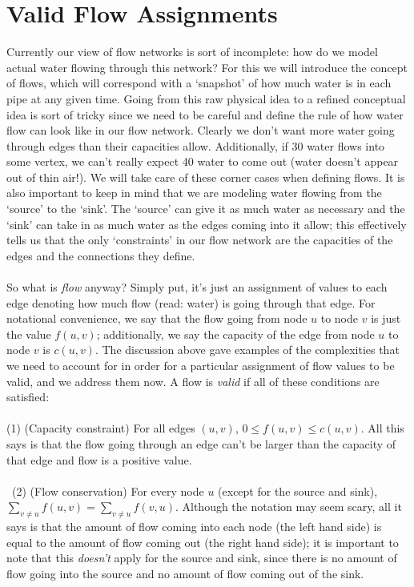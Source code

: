 \documentclass[11pt]{article}
\theoremstyle{plain}
\theoremstyle{definition}
\begin{document}
\section{Valid Flow Assignments}
Currently our view of flow networks is sort of incomplete: how do we model actual water flowing through this network? For this we will introduce the concept of flows, which will correspond with a `snapshot' of how much water is in each pipe at any given time. Going from this raw physical idea to a refined conceptual idea is sort of tricky since we need to be careful and define the rule of how water flow can look like in our flow network. Clearly we don't want more water going through edges than their capacities allow. Additionally, if 30 water flows into some vertex, we can't really expect 40 water to come out (water doesn't appear out of thin air!). We will take care of these corner cases when defining flows. It is also important to keep in mind that we are modeling water flowing from the `source' to the `sink'. The `source' can give it as much water as necessary and the `sink' can take in as much water as the edges coming into it allow; this effectively tells us that the only `constraints' in our flow network are the capacities of the edges and the connections they define.\\\\
So what is \emph{flow} anyway? Simply put, it's just an assignment of values to each edge denoting how much flow (read: water) is going through that edge. For notational convenience, we say that the flow going from node $u$ to node $v$ is just the value $f(u, v)$; additionally, we say the capacity of the edge from node $u$ to node $v$ is $c(u, v)$. The discussion above gave examples of the complexities that we need to account for in order for a particular assignment of flow values to be valid, and we address them now. A flow is \emph{valid} if all of these conditions are satisfied:
\\\\
(1) (Capacity constraint) For all edges $(u, v)$, $0 \leq f(u, v) \leq c(u, v)$. All this says is that the flow going through an edge can't be larger than the capacity of that edge and flow is a positive value.
\\\\\
(2) (Flow conservation) For every node $u$ (except for the source and sink), $\sum_{v \neq u}{f(u, v)} = \sum_{v \neq u}{f(v, u)}$. Although the notation may seem scary, all it says is that the amount of flow coming into each node (the left hand side) is equal to the amount of flow coming out (the right hand side); it is important to note that this \emph{doesn't} apply for the source and sink, since there is no amount of flow going into the source and no amount of flow coming out of the sink.
\end{document}
